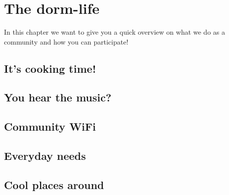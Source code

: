 \chapter{The dorm-life} \label{chap:activities}

In this chapter we want to give you a quick overview on what we do as a community and how you can participate!

\section{It's cooking time!} \label{sec:cooking}

\section{You hear the music?} \label{sec:speakers}

\section{Community WiFi} \label{sec:wifi}

\section{Everyday needs}

\section{Cool places around}
